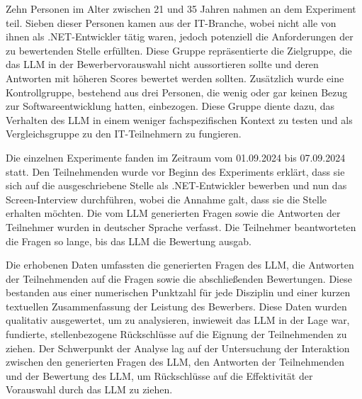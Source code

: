 Zehn Personen im Alter zwischen 21 und 35 Jahren nahmen an dem Experiment teil. 
Sieben dieser Personen kamen aus der IT-Branche, wobei nicht alle von ihnen als .NET-Entwickler tätig waren, 
jedoch potenziell die Anforderungen der zu bewertenden Stelle erfüllten. Diese Gruppe 
repräsentierte die Zielgruppe, die das \ac{LLM} in der Bewerbervorauswahl nicht aussortieren sollte und 
deren Antworten mit höheren Scores bewertet werden sollten. Zusätzlich wurde eine Kontrollgruppe, 
bestehend aus drei Personen, die wenig oder gar keinen Bezug zur Softwareentwicklung hatten, einbezogen. 
Diese Gruppe diente dazu, das Verhalten des \ac{LLM} in einem weniger fachspezifischen Kontext zu 
testen und als Vergleichsgruppe zu den IT-Teilnehmern zu fungieren. 


Die einzelnen Experimente fanden im Zeitraum vom 01.09.2024 bis 07.09.2024 statt. Den 
Teilnehmenden wurde vor Beginn des Experiments erklärt, dass sie sich auf die ausgeschriebene 
Stelle als .NET-Entwickler bewerben und nun das Screen-Interview durchführen, wobei die Annahme 
galt, dass sie die Stelle erhalten möchten. Die vom \ac{LLM} generierten Fragen sowie die Antworten der 
Teilnehmer wurden in deutscher Sprache verfasst. Die Teilnehmer beantworteten die Fragen so lange, 
bis das \ac{LLM} die Bewertung ausgab. 


Die erhobenen Daten umfassten die generierten Fragen des \ac{LLM}, die Antworten der Teilnehmenden auf 
die Fragen sowie die abschließenden Bewertungen. Diese bestanden aus einer numerischen Punktzahl 
für jede Disziplin und einer kurzen textuellen Zusammenfassung der Leistung des Bewerbers. 
Diese Daten wurden qualitativ ausgewertet, um zu analysieren, inwieweit das \ac{LLM} in der Lage war, 
fundierte, stellenbezogene Rückschlüsse auf die Eignung der Teilnehmenden zu ziehen. Der 
Schwerpunkt der Analyse lag auf der Untersuchung der Interaktion zwischen den generierten Fragen 
des \ac{LLM}, den Antworten der Teilnehmenden und der Bewertung des \ac{LLM}, um Rückschlüsse auf die 
Effektivität der Vorauswahl durch das \ac{LLM} zu ziehen. 






